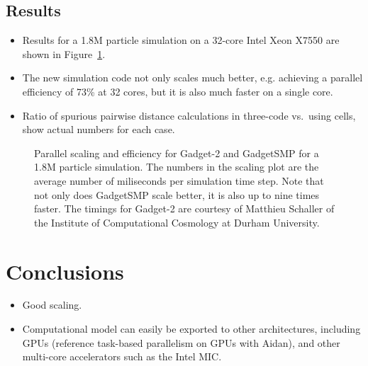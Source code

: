 \documentclass[final]{siamltex}
\newcommand{\fig}[1]
    {Figure~\ref{fig:#1}}
\begin{document}
\subsection{Results}

\begin{itemize}

    \item Results for a 1.8M particle simulation on a 32-core Intel Xeon X7550
        are shown in \fig{Results}.
        
    \item The new simulation code not only scales much better, e.g. achieving
        a parallel efficiency of 73\% at 32 cores, but it is also much faster
        on a single core.
        
    \item Ratio of spurious pairwise distance calculations in three-code
        vs.~using cells, show actual numbers for each case.

\end{itemize}


\begin{figure}[ht]
    \centerline{}
    
    \caption{Parallel scaling and efficiency for Gadget-2 and GadgetSMP
        for a 1.8M particle simulation.
        The numbers in the scaling plot are the average number of miliseconds
        per simulation time step.
        Note that not only does GadgetSMP scale better, it is also up to nine
        times faster.
        The timings for Gadget-2 are courtesy of Matthieu Schaller of the
        Institute of Computational Cosmology at Durham University.}
    \label{fig:Results}
\end{figure}


\section{Conclusions}

\begin{itemize}

    \item Good scaling.
    
    \item Computational model can easily be exported to other architectures,
        including GPUs (reference task-based parallelism on GPUs with Aidan),
        and other multi-core accelerators such as the Intel MIC.
        
\end{itemize}
\end{document}
